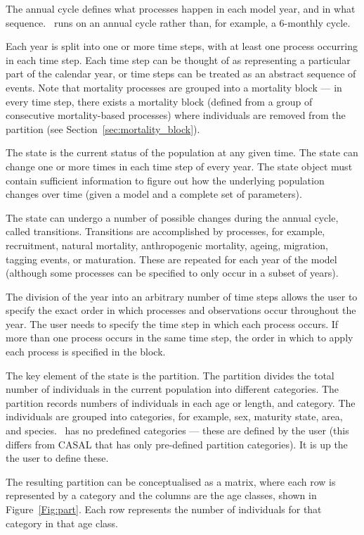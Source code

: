 The annual cycle defines what processes happen in each model year, and in what sequence. \CNAME\ runs on an annual cycle rather than, for example, a 6-monthly cycle.

Each year is split into one or more time steps, with at least one process occurring in each time step. Each time step can be thought of as representing a particular part of the calendar year, or time steps can be treated as an abstract sequence of events. Note that mortality processes are grouped into a mortality block --- in every time step, there exists a mortality block (defined from a group of consecutive mortality-based processes) where individuals are removed from the partition (see Section~\ref{sec:mortality_block}).

The state is the current status of the population at any given time. The state can change one or more times in each time step of every year. The state object must contain sufficient information to figure out how the underlying population changes over time (given a model and a complete set of parameters).

The state can undergo a number of possible changes during the annual cycle, called transitions. Transitions are accomplished by processes, for example, recruitment, natural mortality, anthropogenic mortality, ageing, migration, tagging events, or maturation. These are repeated for each year of the model (although some processes can be specified to only occur in a subset of years).

The division of the year into an arbitrary number of time steps allows the user to specify the exact order in which processes and observations occur throughout the year. The user needs to specify the time step in which each process occurs. If more than one process occurs in the same time step, the order in which to apply each process is specified in the  block.

The key element of the state is the partition. The partition divides the total number of individuals in the current population into different categories. The partition records numbers of individuals in each age or length, and category. The individuals are grouped into categories, for example, sex, maturity state, area, and species. \CNAME\ has no predefined categories --- these are defined by the user (this differs from CASAL \citep{1388} that has only pre-defined partition categories). It is up the the user to define these.

The resulting partition can be conceptualised as a matrix, where each row is represented by a category and the columns are the age classes, shown in Figure~\ref{Fig:part}. Each row represents the number of individuals for that category in that age class. 
	

